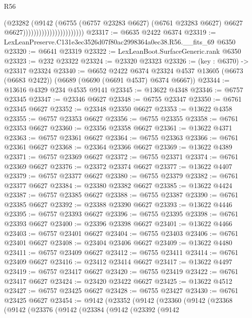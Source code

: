 \begin{lexlean}{R56}
\begin{coremodule}
                                            (@23282
                                              (@9142
                                                (@6755
                                                  (@6757 @23283 @6627)
                                                  (@6761 @23283 @6627)
                                                  @6627
                                                  @6627)))))))))))))))))))))))
@23317 := @6635 @2422 @6374
@23319 := LexLeanPreserve.C131e3ec3526d07f80ac2998364a0ec38.R56.__fits_69 @6350
@23320 := @6641 @23319
@23322 := LexLeanBoot.SurfaceGeneric.rank @6350
@23323 := @232 @23322
@23324 := @23320 @23323
@23326 := (key : @6370) -> @23317 @23324
@23340 := @6652
    @2422
    @6374
    @23324
    @4537
    @13605
    (@6673 (@6683 @2422))
    (@6689 (@6690 (@6691 @4537) @6374 @6667))
@23344 := @13616 @4329 @234 @4535 @9141
@23345 := @13622 @4348
@23346 := @6757 @23345
@23347 := @23346 @6627
@23348 := @6755 @23347
@23350 := @6761 @23345 @6627
@23352 := @23348 @23350 @6627
@23353 := @13622 @4358
@23355 := @6757 @23353 @6627
@23356 := @6755 @23355
@23358 := @6761 @23353 @6627
@23360 := @23356 @23358 @6627
@23361 := @13622 @4371
@23363 := @6757 @23361 @6627
@23364 := @6755 @23363
@23366 := @6761 @23361 @6627
@23368 := @23364 @23366 @6627
@23369 := @13622 @4389
@23371 := @6757 @23369 @6627
@23372 := @6755 @23371
@23374 := @6761 @23369 @6627
@23376 := @23372 @23374 @6627
@23377 := @13622 @4407
@23379 := @6757 @23377 @6627
@23380 := @6755 @23379
@23382 := @6761 @23377 @6627
@23384 := @23380 @23382 @6627
@23385 := @13622 @4424
@23387 := @6757 @23385 @6627
@23388 := @6755 @23387
@23390 := @6761 @23385 @6627
@23392 := @23388 @23390 @6627
@23393 := @13622 @4446
@23395 := @6757 @23393 @6627
@23396 := @6755 @23395
@23398 := @6761 @23393 @6627
@23400 := @23396 @23398 @6627
@23401 := @13622 @4466
@23403 := @6757 @23401 @6627
@23404 := @6755 @23403
@23406 := @6761 @23401 @6627
@23408 := @23404 @23406 @6627
@23409 := @13622 @4480
@23411 := @6757 @23409 @6627
@23412 := @6755 @23411
@23414 := @6761 @23409 @6627
@23416 := @23412 @23414 @6627
@23417 := @13622 @4497
@23419 := @6757 @23417 @6627
@23420 := @6755 @23419
@23422 := @6761 @23417 @6627
@23424 := @23420 @23422 @6627
@23425 := @13622 @4512
@23427 := @6757 @23425 @6627
@23428 := @6755 @23427
@23430 := @6761 @23425 @6627
@23454 := @9142
    (@23352
      (@9142
        (@23360
          (@9142
            (@23368
              (@9142
                (@23376
                  (@9142
                    (@23384
                      (@9142
                        (@23392
                          (@9142

\end{coremodule}
\end{lexlean}

